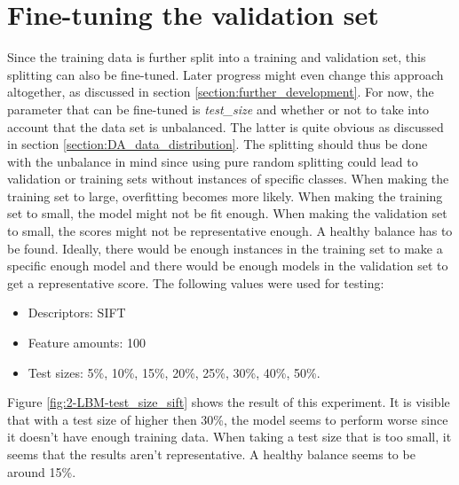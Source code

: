 
\section{Fine-tuning the validation set}
\label{section:LBM_finetuning_validation_set}

Since the training data is further split into a training and validation set, this splitting can also be fine-tuned.
Later progress might even change this approach altogether, as discussed in section \ref{section:further_development}.
For now, the parameter that can be fine-tuned is \emph{test\_size} and whether or not to take into account that the data set is unbalanced.
The latter is quite obvious as discussed in section \ref{section:DA_data_distribution}.
The splitting should thus be done with the unbalance in mind since using pure random splitting could lead to validation or training sets without instances of specific classes.
When making the training set to large, overfitting becomes more likely.
When making the training set to small, the model might not be fit enough.
When making the validation set to small, the scores might not be representative enough.
A healthy balance has to be found.
Ideally, there would be enough instances in the training set to make a specific enough model and there would be enough models in the validation set to get a representative score. 
The following values were used for testing:
\begin{itemize}
    \item Descriptors: SIFT
    \item Feature amounts: 100
    \item Test sizes: 5\%, 10\%, 15\%, 20\%, 25\%, 30\%, 40\%, 50\%.
\end{itemize}

Figure \ref{fig:2-LBM-test_size_sift} shows the result of this experiment.
It is visible that with a test size of higher then 30\%, the model seems to perform worse since it doesn't have enough training data.
When taking a test size that is too small, it seems that the results aren't representative. 
A healthy balance seems to be around 15\%.
 
